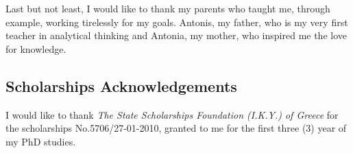 \documentclass[
    12pt, %
    singlespacing, %
    headsepline, %
]{DoctoralThesis} %
\begin{document}
Last but not least, I would like to thank my parents who taught me, through example, working tirelessly for my goals. Antonis, my father, who is my very first teacher in analytical thinking and Antonia, my mother, who inspired me the love for knowledge. 

\subsection*{Scholarships Acknowledgements}
I would like to thank \textit{The State Scholarships Foundation (I.K.Y.) of Greece} for the scholarships No.5706/27-01-2010, granted to me for the first three (3) year of my PhD studies.


\newpage



\end{document}
